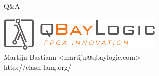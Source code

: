 \documentclass[10pt]{beamer}
\begin{document}
\begin{frame}[fragile]
\vfill

\begin{center}
{\Huge Q\&A}
\end{center}

\vfill

\begin{center}
\includegraphics[width=0.6\textwidth]{img/logo-fpga-innovation-crop.pdf} \\
Martijn Bastiaan <martijn@qbaylogic.com> \\
http://clash-lang.org/ 
\end{center}
\end{frame}
\end{document}
